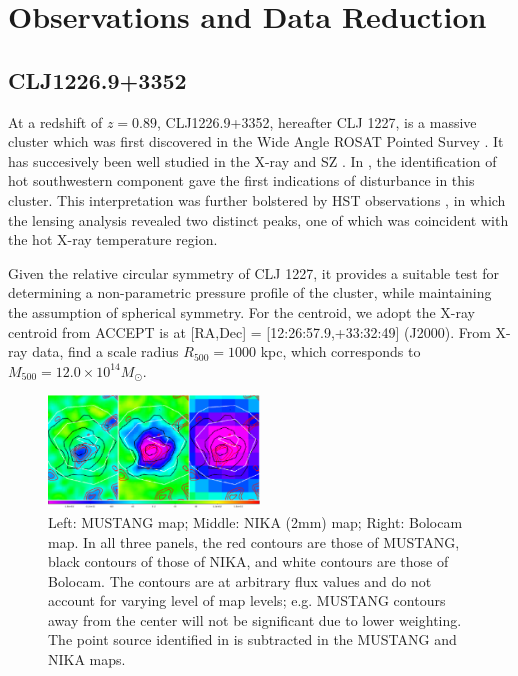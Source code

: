 \documentclass[iop,numberedappendix,apj]{emulateapj}
\begin{document}
\section{Observations and Data Reduction}
\label{sec:obs}

\subsection{CLJ1226.9+3352}
\label{sec:sample_clj1227}



At a redshift of $z=0.89$, CLJ1226.9+3352, hereafter CLJ 1227, is a massive cluster which was first discovered in the
Wide Angle ROSAT Pointed Survey \citep[WARPS][]{ebeling2001}. It has succesively been well studied
in the X-ray
\citep[\emph{XMM},\emph{Chandra}, and \emph{XMM/Chandra}][, respectively]{maughan2004,bonamente2006,maughan2007}
and SZ \citep[][]{joy2001,muchovej2007,mroczkowski2009,mroczkowski2011,bulbul2010,korngut2011,adam2015}.
In \citet{maughan2007}, the identification of hot southwestern component gave the first indications of disturbance
in this cluster. This interpretation was further bolstered by HST observations \citep{jee2009}, in which the lensing
analysis revealed two distinct peaks, one of which was coincident with the hot X-ray temperature region.

Given the relative circular symmetry of CLJ 1227, it provides a suitable test for determining a non-parametric pressure
profile of the cluster, while maintaining the assumption of spherical symmetry. For the centroid, we adopt the X-ray
centroid from ACCEPT \citep{cavagnolo2009} is at [RA,Dec] = [12:26:57.9,+33:32:49] (J2000).
From X-ray data, \citet{mantz2010} find a scale radius $R_{500} = 1000$ kpc, which corresponds to
$M_{500} = 12.0 \times 10^{14} M_{\odot}$.

\begin{figure}[!h]
  \centering
  \includegraphics[width=0.5\textwidth]{NIKA_ml_deproj_figs/CLJ1227_MUSTANG_NIKA_Bolocam_v2.eps}
  \caption{Left: MUSTANG map; Middle: NIKA (2mm) map; Right: Bolocam map. In all three panels, the red contours are those
    of MUSTANG, black contours of those of NIKA, and white contours are those of Bolocam. The contours are at arbitrary
    flux values and do not account for varying level of map levels; e.g. MUSTANG contours away from the center will not
    be significant due to lower weighting. The point source identified in \citet{adam2015} is subtracted in the MUSTANG
    and NIKA maps.}
  \label{fig:clj1227_maps}
\end{figure}
\end{document}
